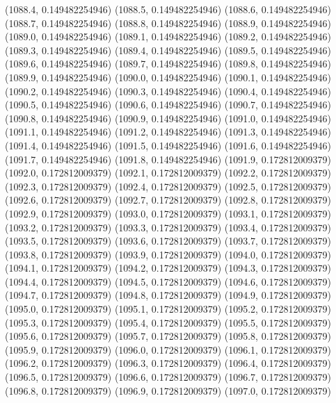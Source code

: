 {					(1088.4, 0.149482254946)
					(1088.5, 0.149482254946)
					(1088.6, 0.149482254946)
					(1088.7, 0.149482254946)
					(1088.8, 0.149482254946)
					(1088.9, 0.149482254946)
					(1089.0, 0.149482254946)
					(1089.1, 0.149482254946)
					(1089.2, 0.149482254946)
					(1089.3, 0.149482254946)
					(1089.4, 0.149482254946)
					(1089.5, 0.149482254946)
					(1089.6, 0.149482254946)
					(1089.7, 0.149482254946)
					(1089.8, 0.149482254946)
					(1089.9, 0.149482254946)
					(1090.0, 0.149482254946)
					(1090.1, 0.149482254946)
					(1090.2, 0.149482254946)
					(1090.3, 0.149482254946)
					(1090.4, 0.149482254946)
					(1090.5, 0.149482254946)
					(1090.6, 0.149482254946)
					(1090.7, 0.149482254946)
					(1090.8, 0.149482254946)
					(1090.9, 0.149482254946)
					(1091.0, 0.149482254946)
					(1091.1, 0.149482254946)
					(1091.2, 0.149482254946)
					(1091.3, 0.149482254946)
					(1091.4, 0.149482254946)
					(1091.5, 0.149482254946)
					(1091.6, 0.149482254946)
					(1091.7, 0.149482254946)
					(1091.8, 0.149482254946)
					(1091.9, 0.172812009379)
					(1092.0, 0.172812009379)
					(1092.1, 0.172812009379)
					(1092.2, 0.172812009379)
					(1092.3, 0.172812009379)
					(1092.4, 0.172812009379)
					(1092.5, 0.172812009379)
					(1092.6, 0.172812009379)
					(1092.7, 0.172812009379)
					(1092.8, 0.172812009379)
					(1092.9, 0.172812009379)
					(1093.0, 0.172812009379)
					(1093.1, 0.172812009379)
					(1093.2, 0.172812009379)
					(1093.3, 0.172812009379)
					(1093.4, 0.172812009379)
					(1093.5, 0.172812009379)
					(1093.6, 0.172812009379)
					(1093.7, 0.172812009379)
					(1093.8, 0.172812009379)
					(1093.9, 0.172812009379)
					(1094.0, 0.172812009379)
					(1094.1, 0.172812009379)
					(1094.2, 0.172812009379)
					(1094.3, 0.172812009379)
					(1094.4, 0.172812009379)
					(1094.5, 0.172812009379)
					(1094.6, 0.172812009379)
					(1094.7, 0.172812009379)
					(1094.8, 0.172812009379)
					(1094.9, 0.172812009379)
					(1095.0, 0.172812009379)
					(1095.1, 0.172812009379)
					(1095.2, 0.172812009379)
					(1095.3, 0.172812009379)
					(1095.4, 0.172812009379)
					(1095.5, 0.172812009379)
					(1095.6, 0.172812009379)
					(1095.7, 0.172812009379)
					(1095.8, 0.172812009379)
					(1095.9, 0.172812009379)
					(1096.0, 0.172812009379)
					(1096.1, 0.172812009379)
					(1096.2, 0.172812009379)
					(1096.3, 0.172812009379)
					(1096.4, 0.172812009379)
					(1096.5, 0.172812009379)
					(1096.6, 0.172812009379)
					(1096.7, 0.172812009379)
					(1096.8, 0.172812009379)
					(1096.9, 0.172812009379)
					(1097.0, 0.172812009379)
}
